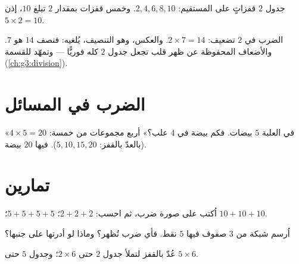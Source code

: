 \begin{omfigure}

{\small جدول $2$ قفزاتٍ على المستقيم: $2, 4, 6, 8, 10$. وخمس
قفزات بمقدار $2$ تبلغ $10$، إذن $5 \times 2 = 10$.}
\end{omfigure}

\begin{example}\label{ex:g2:mult:double}
الضرب في $2$ تضعيف: $2 \times 7 = 14$. والعكس، وهو التنصيف،
يُلغيه: فنصف $14$ هو $7$. والأضعاف المحفوظة عن ظهر قلب تجعل
جدول $2$ كله فوريًّا --- وتمهّد للقسمة
(\cref{ch:g3:division}).
\end{example}

\section{الضرب في المسائل}

\begin{example}\label{ex:g2:mult:problem}
«في العلبة $5$ بيضات. فكم بيضة في $4$ علب؟» أربع مجموعات من
خمسة: $4 \times 5 = 20$ (بالعدّ بالقفز: $5, 10, 15, 20$). فيها
$20$ بيضة.
\end{example}

\section{تمارين}

\begin{exercise}[$\star$]\label{exo:g2:mult:1}
اُكتب على صورة ضرب، ثم احسب: $2 + 2 + 2$؛ \quad
$5 + 5 + 5 + 5$؛ \quad $10 + 10 + 10$.
\end{exercise}

\begin{exercise}[$\star$]\label{exo:g2:mult:2}
اُرسم شبكة من $3$ صفوف فيها $5$ نقط. فأي ضرب تُظهر؟ وماذا لو
أدرتها على جنبها؟
\end{exercise}

\begin{exercise}[$\star$]\label{exo:g2:mult:3}
عُدّ بالقفز لتملأ جدول $2$ حتى $2 \times 6$؛ وجدول
$5$ حتى $5 \times 6$.
\end{exercise}

